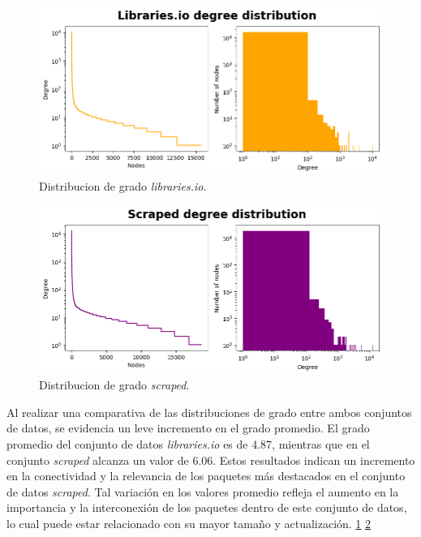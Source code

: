 \begin{figure}[h!]
    \begin{center}
        \includegraphics[width=1\textwidth]{img/cran/distribucion_grado.png}
        \caption{Distribucion de grado \textit{libraries.io}.}
        \label{fig:cran_degree_distribution}
    \end{center}
\end{figure}

\begin{figure}[h!]
    \begin{center}
        \includegraphics[width=1\textwidth]{img/cran/distribucion_grado2.png}
        \caption{Distribucion de grado \textit{scraped}.}
        \label{fig:cran_degree_distribution_scraped}
    \end{center}
\end{figure}

Al realizar una comparativa de las distribuciones de grado entre ambos conjuntos de datos,
se evidencia un leve incremento en el grado promedio. El grado promedio del conjunto de datos
\textit{libraries.io} es de 4.87, mientras que en el conjunto \textit{scraped} alcanza un valor
de 6.06. Estos resultados indican un incremento en la conectividad y la relevancia de los
paquetes más destacados en el conjunto de datos \textit{scraped}. Tal variación en los valores
promedio refleja el aumento en la importancia y la interconexión de los paquetes dentro de este
conjunto de datos, lo cual puede estar relacionado con su mayor tamaño y actualización.
\ref{fig:cran_degree_distribution} \ref{fig:cran_degree_distribution_scraped}

